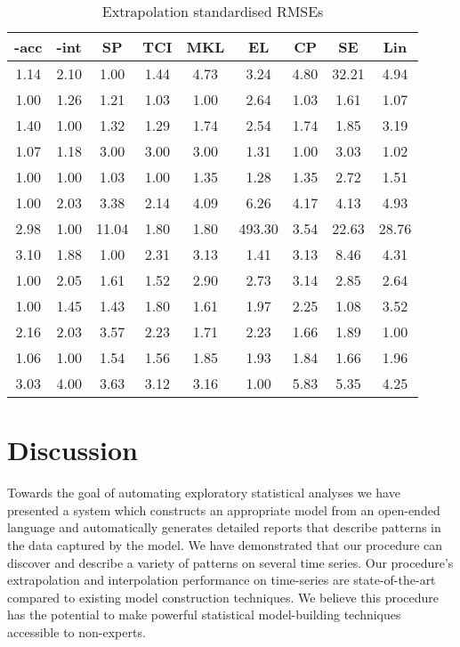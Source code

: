 \begin{table*}[ht]
\center
\begin{tabular}{|c|c|c|c|c|c|c|c|c|}
\hline
\procedurename{}-acc & \procedurename{}-int & SP & TCI & MKL & EL & CP & SE & Lin \\
\hline
1.14 & 2.10 & 1.00 & 1.44 & 4.73 & 3.24 & 4.80 & 32.21 & 4.94\\
1.00 & 1.26 & 1.21 & 1.03 & 1.00 & 2.64 & 1.03 & 1.61 & 1.07\\
1.40 & 1.00 & 1.32 & 1.29 & 1.74 & 2.54 & 1.74 & 1.85 & 3.19\\
1.07 & 1.18 & 3.00 & 3.00 & 3.00 & 1.31 & 1.00 & 3.03 & 1.02\\
1.00 & 1.00 & 1.03 & 1.00 & 1.35 & 1.28 & 1.35 & 2.72 & 1.51\\
1.00 & 2.03 & 3.38 & 2.14 & 4.09 & 6.26 & 4.17 & 4.13 & 4.93\\
2.98 & 1.00 & 11.04 & 1.80 & 1.80 & 493.30 & 3.54 & 22.63 & 28.76\\
3.10 & 1.88 & 1.00 & 2.31 & 3.13 & 1.41 & 3.13 & 8.46 & 4.31\\
1.00 & 2.05 & 1.61 & 1.52 & 2.90 & 2.73 & 3.14 & 2.85 & 2.64\\
1.00 & 1.45 & 1.43 & 1.80 & 1.61 & 1.97 & 2.25 & 1.08 & 3.52\\
2.16 & 2.03 & 3.57 & 2.23 & 1.71 & 2.23 & 1.66 & 1.89 & 1.00\\
1.06 & 1.00 & 1.54 & 1.56 & 1.85 & 1.93 & 1.84 & 1.66 & 1.96\\
3.03 & 4.00 & 3.63 & 3.12 & 3.16 & 1.00 & 5.83 & 5.35 & 4.25\\
\hline
\end{tabular}
\caption{Extrapolation standardised RMSEs}
\label{table:extrap}
\end{table*}

\section{Discussion}
\label{sec:description:discussion}

Towards the goal of automating exploratory statistical analyses we have presented a system which constructs an appropriate model from an open-ended language and automatically generates detailed reports that describe patterns in the data captured by the model.
We have demonstrated that our procedure can discover and describe a variety of patterns on several time series.
Our procedure's extrapolation and interpolation performance on time-series are state-of-the-art compared to existing model construction techniques.
We believe this procedure has the potential to make powerful statistical model-building techniques accessible to non-experts.


